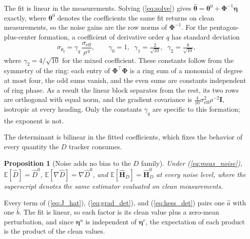 \documentclass[lettersize,journal]{IEEEtran}
\newtheorem{proposition}{Proposition}
\begin{document}
The fit is linear in the measurements. Solving (\ref{eq:solve}) gives
$\hat{\boldsymbol{\theta}} = \boldsymbol{\theta}^0 +
\boldsymbol{\Phi}^{-1}\boldsymbol{\eta}$ exactly, where
$\boldsymbol{\theta}^0$ denotes the coefficients the same fit returns on
clean measurements, so the noise gains are the row norms of
$\boldsymbol{\Phi}^{-1}$. For the pentagon-plus-center formation, a
coefficient of derivative order $q$ has standard deviation
\begin{equation}
    \sigma_{\theta_q} = \gamma_q\,
    \frac{\sigma_{\mathrm{eff}}}{\rho^{\,q}},
    \qquad
    \gamma_0 = 1, \;\;
    \gamma_1 = \tfrac{2}{\sqrt{10}}, \;\;
    \gamma_2 = \tfrac{8}{\sqrt{10}},
    \label{eq:gain_ladder}
\end{equation}
where $\gamma_2 = 4/\sqrt{10}$ for the mixed coefficient. These
constants follow from the symmetry of the ring: each entry of
$\boldsymbol{\Phi}^\top\boldsymbol{\Phi}$ is a ring sum of a monomial of
degree at most four, the odd sums vanish, and the even sums are
constants independent of ring phase. As a result the linear block
separates from the rest, its two rows are orthogonal with equal norm,
and the gradient covariance is
$\tfrac{4}{10}\sigma_{\mathrm{eff}}^2\rho^{-2}\mathbf{I}$, isotropic at
every heading. Only the constants $\gamma_q$ are specific to this
formation; the exponent is not.

The determinant is bilinear in the fitted coefficients, which fixes the
behavior of every quantity the $D$ tracker consumes.

\begin{proposition}[Noise adds no bias to the $D$ family]
\label{prop:unbiased}
Under (\ref{eq:meas_noise}), $\mathbb{E}[\hat{D}] = \hat{D}^{0}$,
$\mathbb{E}[\nabla\hat{D}] = \nabla\hat{D}^{0}$, and
$\mathbb{E}[\hat{\mathbf{H}}_D] = \hat{\mathbf{H}}_D^{0}$ at every noise
level, where the superscript denotes the same estimator evaluated on
clean measurements.
\end{proposition}

\begin{IEEEproof}
Every term of (\ref{eq:J_hat}), (\ref{eq:grad_det}), and
(\ref{eq:hess_det}) pairs one $\hat{a}$ with one $\hat{b}$. The fit is
linear, so each factor is its clean value plus a zero-mean perturbation,
and since $\boldsymbol{\eta}^u$ is independent of
$\boldsymbol{\eta}^v$, the expectation of each product is the product of
the clean values.
\end{IEEEproof}
\end{document}
